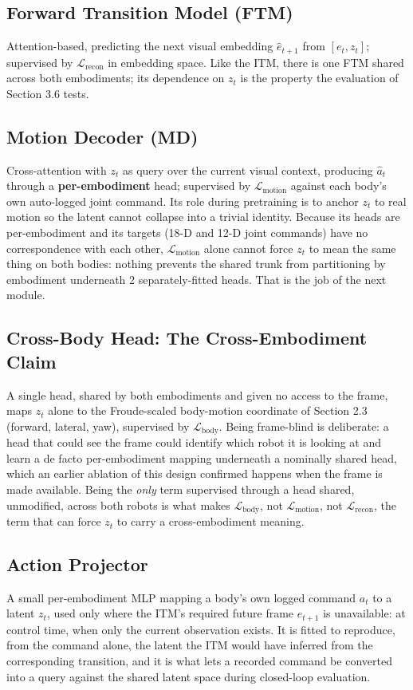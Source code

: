 \documentclass[12pt,a4paper,oneside]{report}
\begin{document}
\subsection{Forward Transition Model (FTM)}
Attention-based, predicting the next visual embedding $\hat{e}_{t+1}$ from $[e_t, z_t]$; supervised by
$\mathcal{L}_{\text{recon}}$ in embedding space. Like the ITM, there is one FTM shared across both embodiments; its
dependence on $z_t$ is the property the evaluation of Section 3.6 tests.

\subsection{Motion Decoder (MD)}
Cross-attention with $z_t$ as query over the current visual context, producing $\hat{a}_t$ through a
\textbf{per-embodiment} head; supervised by $\mathcal{L}_{\text{motion}}$ against each body's own auto-logged
joint command. Its role during pretraining is to anchor $z_t$ to real motion so the latent cannot collapse into a
trivial identity. Because its heads are per-embodiment and its targets (18-D and 12-D joint commands) have no
correspondence with each other, $\mathcal{L}_{\text{motion}}$ alone cannot force $z_t$ to mean the same thing on
both bodies: nothing prevents the shared trunk from partitioning by embodiment underneath 2 separately-fitted
heads. That is the job of the next module.

\subsection{Cross-Body Head: The Cross-Embodiment Claim}
A single head, shared by both embodiments and given no access to the frame, maps $z_t$ alone to the Froude-scaled
body-motion coordinate of Section 2.3 (forward, lateral, yaw), supervised by $\mathcal{L}_{\text{body}}$. Being
frame-blind is deliberate: a head that could see the frame could identify which robot it is looking at and learn
a de facto per-embodiment mapping underneath a nominally shared head, which an earlier ablation of this design
confirmed happens when the frame is made available. Being the \emph{only} term supervised through a head shared,
unmodified, across both robots is what makes $\mathcal{L}_{\text{body}}$, not $\mathcal{L}_{\text{motion}}$, not
$\mathcal{L}_{\text{recon}}$, the term that can force $z_t$ to carry a cross-embodiment meaning.

\subsection{Action Projector}
A small per-embodiment MLP mapping a body's own logged command $a_t$ to a latent $z_t$, used only where the ITM's
required future frame $e_{t+1}$ is unavailable: at control time, when only the current observation exists. It
is fitted to reproduce, from the command alone, the latent the ITM would have inferred from the corresponding
transition, and it is what lets a recorded command be converted into a query against the shared latent space
during closed-loop evaluation.
\end{document}
